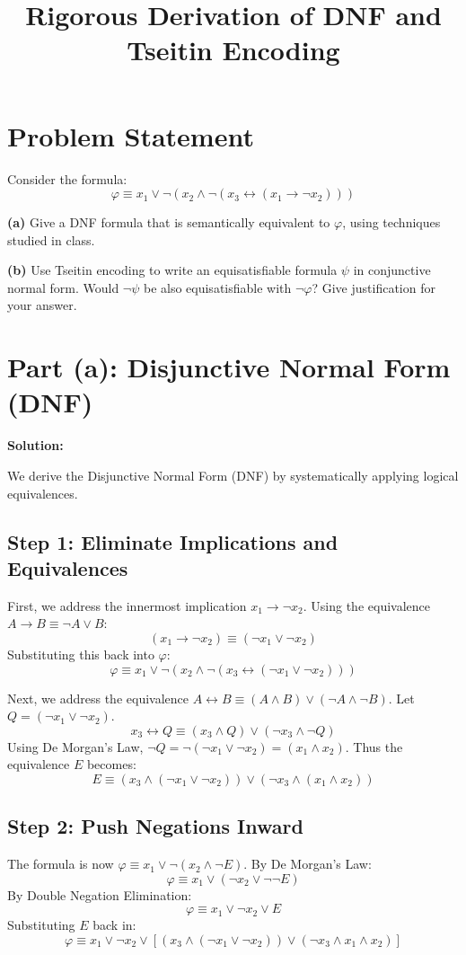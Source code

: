 \documentclass[12pt,a4paper]{article}
\title{\textbf{Rigorous Derivation of DNF and Tseitin Encoding}}
\author{}
\date{}
\begin{document}
\maketitle

\section*{Problem Statement}

Consider the formula:
\[
    \varphi \equiv x_1 \lor \neg(x_2 \land \neg(x_3 \leftrightarrow (x_1 \to \neg x_2)))
\]

\textbf{(a)} Give a DNF formula that is semantically equivalent to $\varphi$, using techniques studied in class.

\textbf{(b)} Use Tseitin encoding to write an equisatisfiable formula $\psi$ in conjunctive normal form. Would $\neg \psi$ be also equisatisfiable with $\neg \varphi$? Give justification for your answer.

\section*{Part (a): Disjunctive Normal Form (DNF)}

\textbf{Solution:}

We derive the Disjunctive Normal Form (DNF) by systematically applying logical equivalences.

\subsection*{Step 1: Eliminate Implications and Equivalences}
First, we address the innermost implication $x_1 \to \neg x_2$. Using the equivalence $A \to B \equiv \neg A \lor B$:
\[ (x_1 \to \neg x_2) \equiv (\neg x_1 \lor \neg x_2) \]
Substituting this back into $\varphi$:
\[ \varphi \equiv x_1 \lor \neg(x_2 \land \neg(x_3 \leftrightarrow (\neg x_1 \lor \neg x_2))) \]

Next, we address the equivalence $A \leftrightarrow B \equiv (A \land B) \lor (\neg A \land \neg B)$. Let $Q = (\neg x_1 \lor \neg x_2)$.
\[ x_3 \leftrightarrow Q \equiv (x_3 \land Q) \lor (\neg x_3 \land \neg Q) \]
Using De Morgan's Law, $\neg Q = \neg(\neg x_1 \lor \neg x_2) = (x_1 \land x_2)$. Thus the equivalence $E$ becomes:
\[ E \equiv (x_3 \land (\neg x_1 \lor \neg x_2)) \lor (\neg x_3 \land (x_1 \land x_2)) \]

\subsection*{Step 2: Push Negations Inward}
The formula is now $\varphi \equiv x_1 \lor \neg(x_2 \land \neg E)$. By De Morgan's Law:
\[ \varphi \equiv x_1 \lor (\neg x_2 \lor \neg \neg E) \]
By Double Negation Elimination:
\[ \varphi \equiv x_1 \lor \neg x_2 \lor E \]
Substituting $E$ back in:
\[ \varphi \equiv x_1 \lor \neg x_2 \lor \left[ (x_3 \land (\neg x_1 \lor \neg x_2)) \lor (\neg x_3 \land x_1 \land x_2) \right] \]
\end{document}
